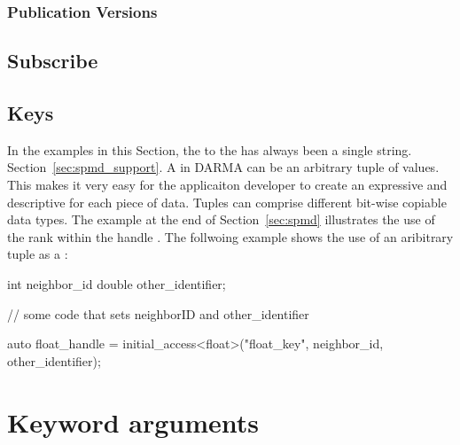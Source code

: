 \subsubsection{Publication Versions}

\subsection{Subscribe}
\label{subsec:subscribe}

\subsection{Keys}
\label{subsec:keys}
In the examples in this Section, the  to the
 has always been a single string.
Section~\ref{sec:spmd_support}. A
 in DARMA 
can be an arbitrary \gls{tuple} of values.  This 
makes it very easy for the applicaiton developer to create an expressive
and descriptive  for each piece of data.  Tuples can comprise
different bit-wise copiable data types.  The example at the end of
Section~\ref{sec:spmd} illustrates the use of the \gls{rank} within the handle
.  The follwoing example shows the use of an
aribitrary \gls{tuple} as a :
\begin{CppCode}
  int neighbor_id
  double other_identifier;

  // some code that sets neighborID and other_identifier
  
  auto float_handle = initial_access<float>("float_key", 
                                            neighbor_id, 
                                            other_identifier);
\end{CppCode}


\section{Keyword arguments}
\label{sec:keyword}


